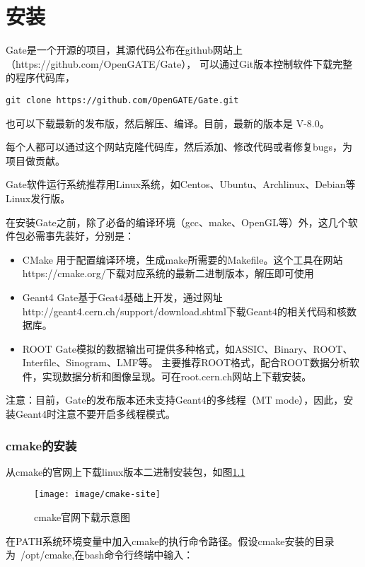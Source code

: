 
\chapter{安装}


Gate是一个开源的项目，其源代码公布在github网站上（https://github.com/OpenGATE/Gate），
可以通过Git版本控制软件下载完整的程序代码库，

\begin{lstlisting}
git clone https://github.com/OpenGATE/Gate.git
\end{lstlisting}


也可以下载最新的发布版，然后解压、编译。目前，最新的版本是 V-8.0。

每个人都可以通过这个网站克隆代码库，然后添加、修改代码或者修复bugs，为项目做贡献。

Gate软件运行系统推荐用Linux系统，如Centos、Ubuntu、Archlinux、Debian等Linux发行版。

在安装Gate之前，除了必备的编译环境（gcc、make、OpenGL等）外，这几个软件包必需事先装好，分别是：

\begin{itemize}
	\item CMake 用于配置编译环境，生成make所需要的Makefile。这个工具在网站https://cmake.org/下载对应系统的最新二进制版本，解压即可使用
	\item Geant4 Gate基于Geat4基础上开发，通过网址http://geant4.cern.ch/support/download.shtml下载Geant4的相关代码和核数据库。
	\item ROOT  Gate模拟的数据输出可提供多种格式，如ASSIC、Binary、ROOT、Interfile、Sinogram、LMF等。
			主要推荐ROOT格式，配合ROOT数据分析软件，实现数据分析和图像呈现。可在root.cern.ch网站上下载安装。
\end{itemize}

注意：目前，Gate的发布版本还未支持Geant4的多线程（MT mode），因此，安装Geant4时注意不要开启多线程模式。

\subsection{cmake的安装}
从cmake的官网上下载linux版本二进制安装包，如图\ref{fig:cmake-site}

\begin{figure}[H]
	\centering
	\texttt{[image: image/cmake-site]}
	\caption[]{cmake官网下载示意图}
	\label{fig:cmake-site}
\end{figure}
在PATH系统环境变量中加入cmake的执行命令路径。假设cmake安装的目录为~/opt/cmake,在bash命令行终端中输入：

